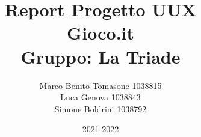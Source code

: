 \documentclass[12pt, a4paper]{report}
\begin{document}
\title{Report Progetto UUX\\

Gioco.it\\
Gruppo: La Triade\\
}
\author{Marco Benito Tomasone 1038815\\
Luca Genova 1038843\\
Simone Boldrini 1038792}
\date{2021-2022}
\maketitle
\tableofcontents












\end{document}
